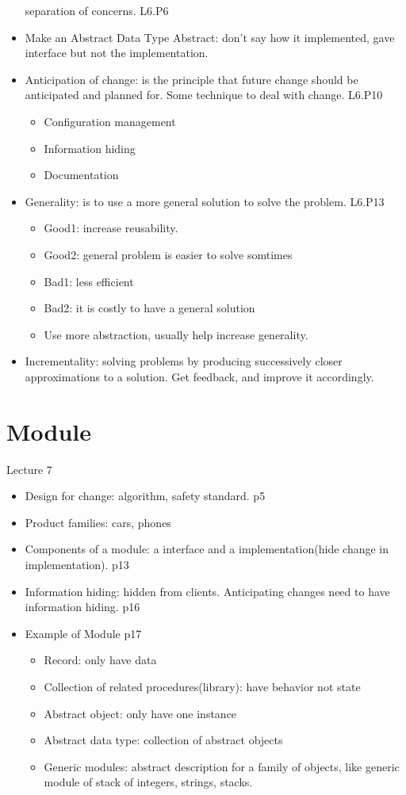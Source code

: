 \documentclass[12pt]{article}
\begin{document}
\begin{itemize}
    separation of concerns. L6.P6
    \item Make an Abstract Data Type Abstract: don’t say how it implemented, gave interface but not the implementation.
    \item Anticipation of change: is the principle that future change should be anticipated and planned for.
    Some technique to deal with change. L6.P10
    \begin{itemize}
        \item Configuration management
        \item Information hiding
        \item Documentation
    \end{itemize}
    \item Generality: is to use a more general solution to solve the problem. L6.P13
    \begin{itemize}
        \item Good1: increase reusability.
        \item Good2: general problem is easier to solve somtimes
        \item Bad1: less efficient
        \item Bad2: it is costly to have a general solution
        \item Use more abstraction, usually help increase generality.
    \end{itemize}
    \item Incrementality: solving problems by producing successively closer approximations to a solution. Get feedback, 
    and improve it accordingly.
\end{itemize}

\section{Module}
Lecture 7
\begin{itemize}
    \item Design for change: algorithm, safety standard. p5
    \item Product families: cars, phones
    \item Components of a module: a interface and a implementation(hide change in implementation). p13
    \item Information hiding: hidden from clients. Anticipating changes need to have information hiding. p16
    \item Example of Module p17
    \begin{itemize}
        \item Record: only have data
        \item Collection of related procedures(library): have behavior not state
        \item Abstract object: only have one instance
        \item Abstract data type: collection of abstract objects
        \item Generic modules: abstract description for a family of objects, like generic module of stack of integers, 
        strings, stacks.
    \end{itemize}
\end{itemize}
\end{document}
